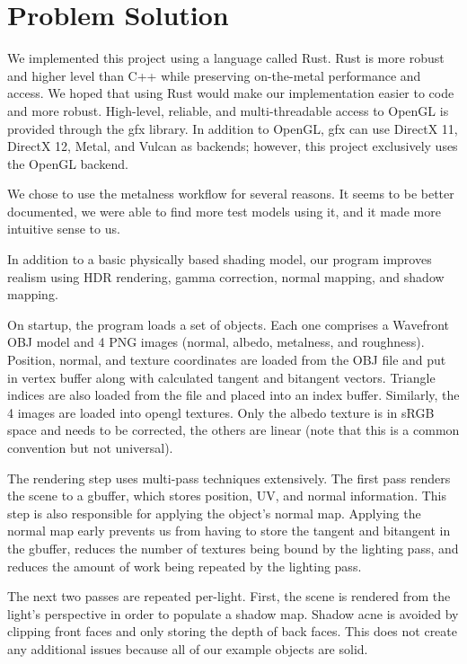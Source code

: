 \documentclass[12pt, letterpaper, twocolumn]{article}
\begin{document}
\section{Problem Solution}

We implemented this project using a language called Rust. Rust is more robust
and higher level than C++ while preserving on-the-metal performance and
access. We hoped that using Rust would make our implementation easier to code
and more robust. High-level, reliable, and multi-threadable access to OpenGL
is provided through the gfx library. In addition to OpenGL, gfx can use
DirectX 11, DirectX 12, Metal, and Vulcan as backends; however, this project
exclusively uses the OpenGL backend.

We chose to use the metalness workflow for several reasons. It seems to be
better documented, we were able to find more test models using it, and it made
more intuitive sense to us.

In addition to a basic physically based shading model, our program improves
realism using HDR rendering, gamma correction, normal mapping, and shadow
mapping.

On startup, the program loads a set of objects. Each one comprises a Wavefront
OBJ model and 4 PNG images (normal, albedo, metalness, and roughness).
Position, normal, and texture coordinates are loaded from the OBJ file and put
in vertex buffer along with calculated tangent and bitangent vectors. Triangle
indices are also loaded from the file and placed into an index buffer.
Similarly, the 4 images are loaded into opengl textures. Only the albedo
texture is in sRGB space and needs to be corrected, the others are linear
(note that this is a common convention but not universal).

The rendering step uses multi-pass techniques extensively. The first pass
renders the scene to a gbuffer, which stores position, UV, and normal
information. This step is also responsible for applying the object’s normal
map. Applying the normal map early prevents us from having to store the
tangent and bitangent in the gbuffer, reduces the number of textures being
bound by the lighting pass, and reduces the amount of work being repeated by
the lighting pass.

The next two passes are repeated per-light. First, the scene is rendered from
the light’s perspective in order to populate a shadow map. Shadow acne is
avoided by clipping front faces and only storing the depth of back faces. This
does not create any additional issues because all of our example objects are
solid.
\end{document}
